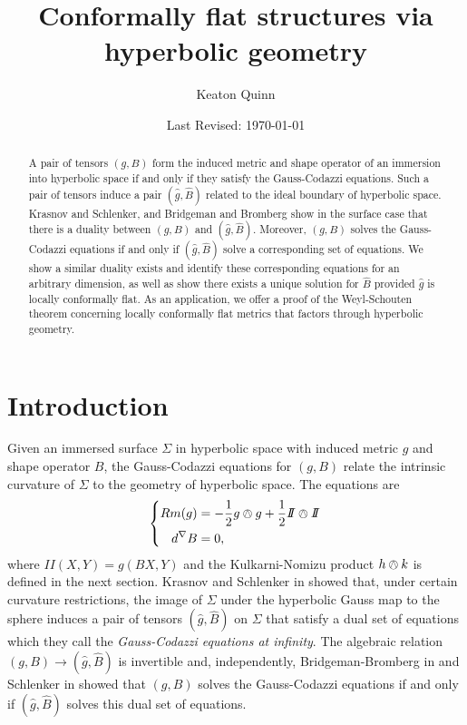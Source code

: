 \documentclass{amsart}
\newcommand{\two}{I\!\!I}
\begin{document}
\title{Conformally flat structures via hyperbolic geometry}
\author{Keaton Quinn}
\date{Last Revised: \today}

\begin{abstract}
A pair of tensors $(g,B)$ form the induced metric and shape operator of an immersion into hyperbolic space if and only if they satisfy the Gauss-Codazzi equations. 
Such a pair of tensors induce a pair $(\hat{g},\hat{B})$ related to the ideal boundary of hyperbolic space.
Krasnov and Schlenker, and Bridgeman and Bromberg show in the surface case that there is a duality between $(g,B)$ and $(\hat{g},\hat{B})$. 
Moreover, $(g,B)$ solves the Gauss-Codazzi equations if and only if $(\hat{g},\hat{B})$ solve a corresponding set of equations. 
We show a similar duality exists and identify these corresponding equations for an arbitrary dimension, as well as show there exists a unique solution for $\hat{B}$ provided  $\hat{g}$ is locally conformally flat. 
As an application, we offer a proof of the Weyl-Schouten theorem concerning locally conformally flat metrics that factors through hyperbolic geometry. 
\end{abstract}

\maketitle

\section{Introduction}

Given an immersed surface $\Sigma$ in hyperbolic space with induced metric $g$ and shape operator $B$, the Gauss-Codazzi equations for $(g,B)$ relate the intrinsic curvature of $\Sigma$ to the geometry of hyperbolic space.
The equations are
\[
\left\{
\begin{aligned}
Rm(g) &= -\frac{1}{2}g \owedge g + \frac{1}{2}\two \owedge \two \\
d^\nabla B &= 0,
\end{aligned}
\right.
\]
where $\two(X,Y) = g(BX,Y)$ and the Kulkarni-Nomizu product $h \owedge k$ is defined in the next section.
Krasnov and Schlenker in \cite{Krasnov-Schlenker2008} showed that, under certain curvature restrictions, the image of $\Sigma$ under the hyperbolic Gauss map to the sphere induces a pair of tensors $(\hat{g},\hat{B})$ on $\Sigma$ that satisfy a dual set of equations which they call the \emph{Gauss-Codazzi equations at infinity}. 
The algebraic relation $(g,B) \to (\hat{g},\hat{B})$ is invertible and, independently, Bridgeman-Bromberg in \cite{Bridgeman-Bromberg2022} and Schlenker in \cite{Schlenker2017} showed that $(g,B)$ solves the Gauss-Codazzi equations if and only if $(\hat{g},\hat{B})$ solves this dual set of equations. 
\end{document}

